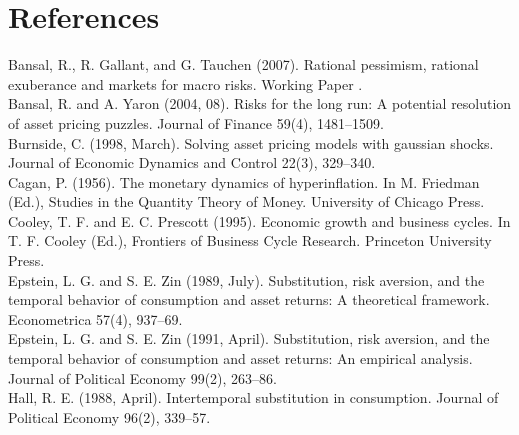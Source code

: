 \documentclass[a4paper,12pt]{scrartcl} %
\begin{document}

\clearpage


\onehalfspacing


\printbibliography %
\section{References}
Bansal, R., R. Gallant, and G. Tauchen (2007). Rational pessimism, rational exuberance and markets for macro risks. Working Paper .\\

Bansal, R. and A. Yaron (2004, 08). Risks for the long run: A potential resolution of asset pricing puzzles. Journal of Finance 59(4), 1481–1509.\\

Burnside, C. (1998, March). Solving asset pricing models with gaussian shocks. Journal of Economic Dynamics and Control 22(3), 329–340.\\

Cagan, P. (1956). The monetary dynamics of hyperinflation. In M. Friedman (Ed.), Studies in the Quantity Theory of Money. University of Chicago Press.\\

Cooley, T. F. and E. C. Prescott (1995). Economic growth and business cycles. In T. F. Cooley (Ed.), Frontiers of Business Cycle Research. Princeton University Press.\\

Epstein, L. G. and S. E. Zin (1989, July). Substitution, risk aversion, and the temporal behavior of consumption and asset returns: A theoretical framework. Econometrica 57(4), 937–69.\\

Epstein, L. G. and S. E. Zin (1991, April). Substitution, risk aversion, and the temporal behavior of consumption and asset returns: An empirical analysis. Journal of Political Economy 99(2), 263–86.\\

Hall, R. E. (1988, April). Intertemporal substitution in consumption. Journal of Political Economy 96(2), 339–57.\\
\end{document}
